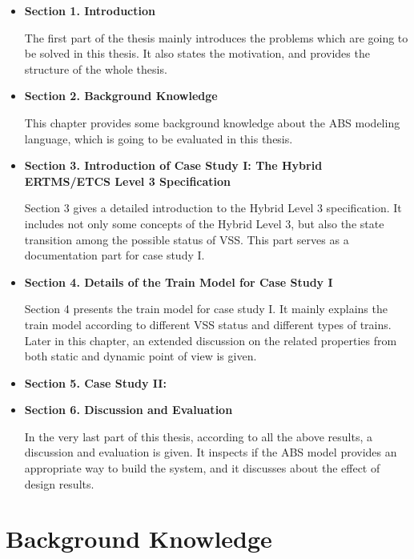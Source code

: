 \documentclass[article,dr=phil,type=msc,colorback,accentcolor=tud9c]{tudthesis}
\begin{document}
  \begin{itemize}
  	
  	\item \textbf{Section 1. Introduction}
  	
  	The first part of the thesis mainly introduces the problems which are going to be solved in this thesis. It also states the motivation, and provides the structure of the whole thesis.
  	
  	\item \textbf{Section 2. Background Knowledge}
  	
  	This chapter provides some background knowledge about the ABS modeling language, which is going to be evaluated in this thesis.
  	
  	\item \textbf{Section 3. Introduction of Case Study I: The Hybrid ERTMS/ETCS Level 3 Specification}
  	
  	Section 3 gives a detailed introduction to the Hybrid Level 3 specification. It includes not only some concepts of the Hybrid Level 3, but also the state transition among the possible status of VSS. This part serves as a documentation part for case study I.
  	
  	\item \textbf{Section 4. Details of the Train Model for Case Study I}
  	
  	Section 4 presents the train model for case study I. It mainly explains the train model according to different VSS status and different types of trains. Later in this chapter, an extended discussion on the related properties from both static and dynamic point of view is given. 
  	
  	\item \textbf{Section 5. Case Study II:}
  	
  	\item \textbf{Section 6. Discussion and Evaluation}
  	
  	In the very last part of this thesis, according to all the above results, a discussion and evaluation is given. It inspects if the ABS model provides an appropriate way to build the system, and it discusses about the effect of design results.
  
  \end{itemize}	

  
  \section{Background Knowledge}
  
\end{document}

